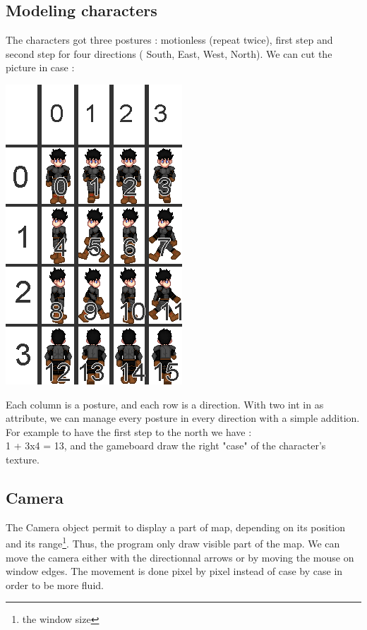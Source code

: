 \documentclass{scrreprt}
\begin{document}
	\subsection{Modeling characters}
	The characters got three postures : motionless (repeat twice), first step and second step for four directions ( South, East, West, North). We can cut the picture in case : 
	\begin{center}
	\includegraphics[scale=0.4]{char.png}
	\end{center}
	Each column is a posture, and each row is a direction. With two int in as attribute, we can manage every posture in every direction with a simple addition. For example to have the first step to the north we have :\\
		1 + 3x4 = 13, and the gameboard draw the right "case" of the character's texture.
		\subsection{Camera}
		The Camera object permit to display a part of map, depending on its position and its range\footnote{the window size}. Thus, the program only draw visible part of the map. We can move the camera either with the directionnal arrows or by moving the mouse on window edges. The movement is done pixel by pixel instead of case by case in order to be more fluid.
\end{document}
